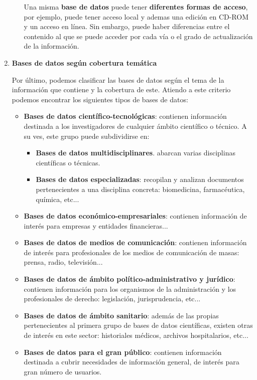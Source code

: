 \begin{enumerate}[label=(\alph*)]
\begin{itemize}
        Una misma \textbf{base de datos} puede tener \textbf{diferentes formas de acceso}, por ejemplo, puede tener acceso local y ademas una edición en CD-ROM y un acceso en línea. Sin embargo, puede haber diferencias entre el contenido al que se puede acceder por cada vía o el grado de actualización de la información.
    \end{itemize}

    \item \textbf{Bases de datos según cobertura temática}

    Por último, podemos clasificar las bases de datos según el tema de la información que contiene y la cobertura de este. Atiendo a este criterio podemos encontrar los siguientes tipos de bases de datos:

    \begin{itemize}
        \item \textbf{Bases de datos científico-tecnológicas}: contienen información destinada a los investigadores de cualquier ámbito científico o técnico. A su ves, este grupo puede subdividirse en:

        \begin{itemize}
            \item \textbf{Bases de datos multidisciplinares}. abarcan varias disciplinas científicas o técnicas.
            \item \textbf{Bases de datos especializadas}: recopilan y analizan documentos pertenecientes a una disciplina concreta: biomedicina, farmacéutica, química, etc...
        \end{itemize}

        \item \textbf{Bases de datos económico-empresariales}: contienen información de interés para empresas y entidades financieras...

        \item \textbf{Bases de datos de medios de comunicación}: contienen información de interés para profesionales de los medios de comunicación de masas: prensa, radio, televisión...

        \item \textbf{Bases de datos de ámbito político-administrativo y jurídico}: contienen información para los organismos de la administración y los profesionales de derecho: legislación, jurisprudencia, etc...

        \item \textbf{Bases de datos de ámbito sanitario}: además de las propias pertenecientes al primera grupo de bases de datos científicas, existen otras de interés en este sector: historiales médicos, archivos hospitalarios, etc...

        \item \textbf{Bases de datos para el gran público}: contienen información destinada a cubrir necesidades de información general, de interés para gran número de usuarios.
    \end{itemize}
\end{enumerate}


